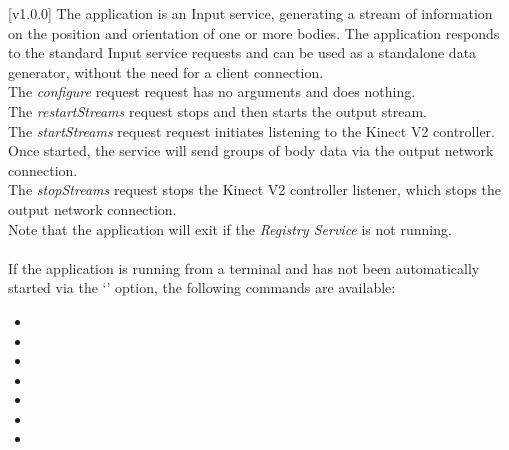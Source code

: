 [v1.0.0]
The  application is an Input service,
generating a stream of information on the position and orientation of one or more bodies.
The application responds to the standard Input service requests and can be used as a
standalone data generator, without the need for a client connection.\\

The \emph{configure} request request has no arguments and does nothing.\\

The \emph{restartStreams} request stops and then starts the output stream.\\

The \emph{startStreams} request request initiates listening to the Kinect V2 controller.
Once started, the service will send groups of body data via the output \yarp{} network
connection.\\

The \emph{stopStreams} request stops the Kinect V2 controller listener, which stops the
output \yarp{} network connection.\\ 

Note that the application will exit if the \emph{Registry Service} is not running.\\

\insertAppParameters{}
\insertTagDescription{\KVtwoI}
\insertInputServiceComment{}\\

If the application is running from a terminal and has not been automatically started via
the `' option, the following commands are available:
\begin{itemize}
\item{}
\item\exSp{}
\item\exSp{}
\item\exSp{}
\item\exSp{}
\item\exSp{}
\item\exSp{}
\end{itemize}
\primaryEnd{}

